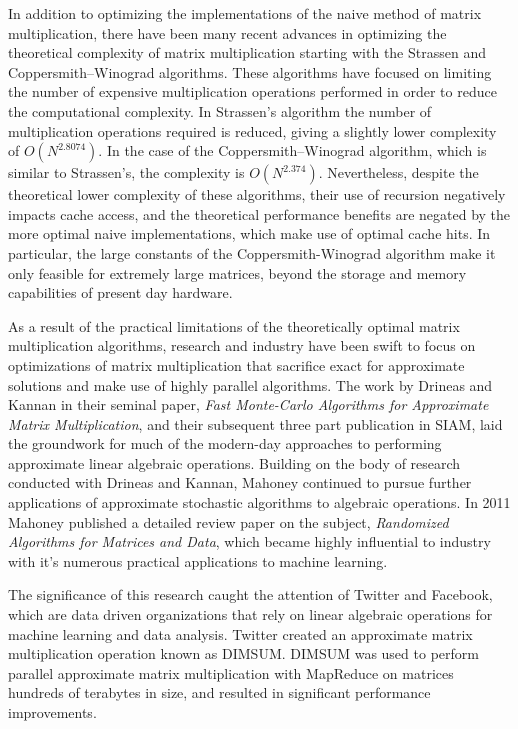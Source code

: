 \documentclass[oneside]{article}
\begin{document}
In addition to optimizing the implementations of the naive method of matrix multiplication, there have been many recent advances in optimizing the theoretical complexity of matrix multiplication starting with the Strassen and Coppersmith–Winograd algorithms\cite{huss1996implementation, coppersmith1987matrix}. These algorithms have focused on limiting the number of expensive multiplication operations performed in order to reduce the computational complexity. In Strassen's algorithm the number of multiplication operations required is reduced, giving a slightly lower complexity of $O(N^{2.8074})$\cite{huss1996implementation}. In the case of the Coppersmith–Winograd algorithm, which is similar to Strassen's, the complexity is $O(N^{2.374})$\cite{stothers2010complexity}. Nevertheless, despite the theoretical lower complexity of these algorithms, their use of recursion negatively impacts cache access, and the theoretical performance benefits are negated by the more optimal naive implementations, which make use of optimal cache hits\cite{note2002reducing}. In particular, the large constants of the Coppersmith-Winograd algorithm make it only feasible for extremely large matrices, beyond the storage and memory capabilities of present day hardware\cite{robinson2005toward}.

As a result of the practical limitations of the theoretically optimal matrix multiplication algorithms, research and industry have been swift to focus on optimizations of matrix multiplication that sacrifice exact for approximate solutions and make use of highly parallel algorithms. The work by Drineas and Kannan in their seminal paper, \emph{Fast Monte-Carlo Algorithms for Approximate Matrix Multiplication}\cite{drineas2001fast}, and their subsequent three part publication in SIAM\cite{drineas2006fastI, drineas2006fastII, drineas2006fastIII}, laid the groundwork for much of the modern-day approaches to performing approximate linear algebraic operations. Building on the body of research conducted with Drineas and Kannan, Mahoney continued to pursue further applications of approximate stochastic algorithms to algebraic operations. In 2011 Mahoney published a detailed review paper on the subject, \emph{Randomized Algorithms for Matrices and Data}\cite{mahoney2011randomized}, which became highly influential to industry with it's numerous practical applications to machine learning.

The significance of this research caught the attention of Twitter and Facebook, which are data driven organizations that rely on linear algebraic operations for machine learning and data analysis. Twitter created an approximate matrix multiplication operation known as DIMSUM. DIMSUM was used to perform parallel approximate matrix multiplication with MapReduce on matrices hundreds of terabytes in size, and resulted in significant performance improvements\cite{zadeh2013dimension}.
\end{document}
